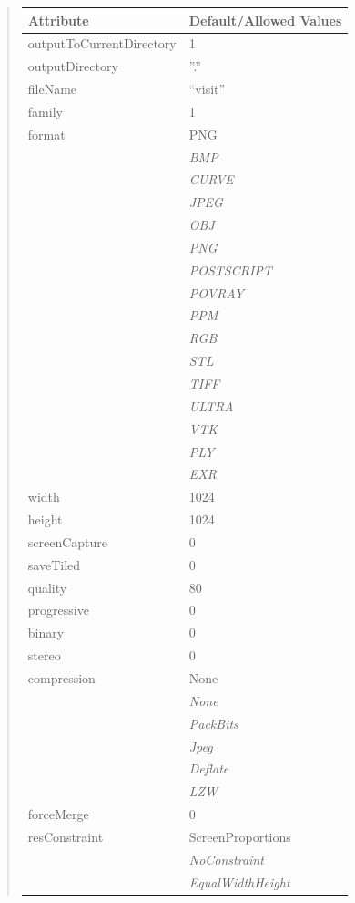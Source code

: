 \documentclass[letterpaper,10pt,english]{sphinxmanual}
\begin{document}
\begin{quote}
\begin{longtable}{|l|l|}
\textbf{Attribute}
 & 
\textbf{Default/Allowed Values}
\\
\hline
outputToCurrentDirectory
 & 
1
\\
\hline
outputDirectory
 & 
''.''
\\
\hline
fileName
 & 
``visit''
\\
\hline
family
 & 
1
\\
\hline
format
 & 
PNG
\\
\hline & 
\emph{BMP}
\\
\hline & 
\emph{CURVE}
\\
\hline & 
\emph{JPEG}
\\
\hline & 
\emph{OBJ}
\\
\hline & 
\emph{PNG}
\\
\hline & 
\emph{POSTSCRIPT}
\\
\hline & 
\emph{POVRAY}
\\
\hline & 
\emph{PPM}
\\
\hline & 
\emph{RGB}
\\
\hline & 
\emph{STL}
\\
\hline & 
\emph{TIFF}
\\
\hline & 
\emph{ULTRA}
\\
\hline & 
\emph{VTK}
\\
\hline & 
\emph{PLY}
\\
\hline & 
\emph{EXR}
\\
\hline
width
 & 
1024
\\
\hline
height
 & 
1024
\\
\hline
screenCapture
 & 
0
\\
\hline
saveTiled
 & 
0
\\
\hline
quality
 & 
80
\\
\hline
progressive
 & 
0
\\
\hline
binary
 & 
0
\\
\hline
stereo
 & 
0
\\
\hline
compression
 & 
None
\\
\hline & 
\emph{None}
\\
\hline & 
\emph{PackBits}
\\
\hline & 
\emph{Jpeg}
\\
\hline & 
\emph{Deflate}
\\
\hline & 
\emph{LZW}
\\
\hline
forceMerge
 & 
0
\\
\hline
resConstraint
 & 
ScreenProportions
\\
\hline & 
\emph{NoConstraint}
\\
\hline & 
\emph{EqualWidthHeight}

\end{longtable}
\end{quote}
\end{document}
